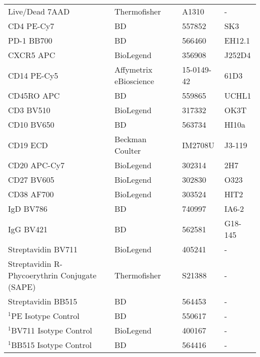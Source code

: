 \documentclass{article}%
\begin{document}
\begin{longtable}{p{4cm}p{4cm}p{4cm}p{3cm}}
\bottomrule
\endlastfoot
                               Live/Dead 7AAD &           Thermofisher &          A1310 &       - \\
                                   CD4 PE-Cy7 &                     BD &         557852 &     SK3 \\
                                   PD-1 BB700 &                     BD &         566460 &  EH12.1 \\
                                    CXCR5 APC &              BioLegend &         356908 &  J252D4 \\
                                  CD14 PE-Cy5 & Affymetrix eBioscience &     15-0149-42 &    61D3 \\
                                   CD45RO APC &                     BD &         559865 &   UCHL1 \\
                                    CD3 BV510 &              BioLegend &         317332 &    OK3T \\
                                   CD10 BV650 &                     BD &         563734 &   HI10a \\
                                     CD19 ECD &        Beckman Coulter &        IM2708U &  J3-119 \\
                                 CD20 APC-Cy7 &              BioLegend &         302314 &     2H7 \\
                                   CD27 BV605 &              BioLegend &         302830 &    O323 \\
                                   CD38 AF700 &              BioLegend &         303524 &    HIT2 \\
                                    IgD BV786 &                     BD &         740997 &   IA6-2 \\
                                    IgG BV421 &                     BD &         562581 & G18-145 \\
                           Streptavidin BV711 &              BioLegend &         405241 &       - \\
Streptavidin R-Phycoerythrin Conjugate (SAPE) &           Thermofisher &         S21388 &       - \\
                           Streptavidin BB515 &                     BD &         564453 &       - \\
                       $^1$PE Isotype Control &                     BD &         550617 &       - \\
                    $^1$BV711 Isotype Control &              BioLegend &         400167 &       - \\
                    $^1$BB515 Isotype Control &                     BD &         564416 &       - \\
\end{longtable}
%
\begin{footnotesize}%
\textit{
}%
\end{footnotesize}%
%
\end{document}
